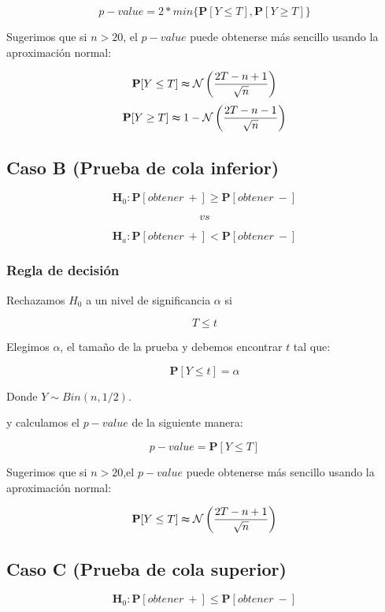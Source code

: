 \documentclass[
  a4paper,
  oneside,
  openany]{book}
\begin{document}
\[p-value=2*min\{\mathbf{P}[Y\leq T],\mathbf{P}[Y\geq T]\}\]

Sugerimos que si \(n > 20\), el \(p-value\) puede obtenerse más sencillo usando la aproximación normal:

\[\mathbf{P}[Y\leq T] \thickapprox  \mathcal{N}\left(\frac{2T-n+1}{\sqrt{n}}\right)\]
\[\mathbf{P}[Y\geq T] \thickapprox 1- \mathcal{N} \left(\frac{2T-n-1}{\sqrt{n}}\right)\]

\hypertarget{caso-b-prueba-de-cola-inferior-2}{%
\subsection*{Caso B (Prueba de cola inferior)}\label{caso-b-prueba-de-cola-inferior-2}}


\[\textbf{H}_0: \mathbf{P}[obtener\ +] \geq \mathbf{P}[obtener\ -]\]

\[vs\]

\[\textbf{H}_a: \mathbf{P}[obtener\ +] < \mathbf{P}[obtener\ -]\]

\hypertarget{regla-de-decisiuxf3n-7}{%
\subsubsection*{Regla de decisión}\label{regla-de-decisiuxf3n-7}}


Rechazamos \(H_0\) a un nivel de significancia \(\alpha\) si

\[T \leq t\]

Elegimos \(\alpha\), el tamaño de la prueba y debemos encontrar \(t\) tal que:

\[\mathbf{P}[Y \leq t]=\alpha\]

Donde \(Y \sim Bin (n,1/2)\).

y calculamos el \(p-value\) de la siguiente manera:

\[p-value=\mathbf{P}[Y\leq T]\]

Sugerimos que si \(n > 20\),el \(p-value\) puede obtenerse más sencillo usando la aproximación normal:

\[\mathbf{P}[Y\leq T] \thickapprox  \mathcal{N} \left(\frac{2T-n+1}{\sqrt{n}}\right)\]

\hypertarget{caso-c-prueba-de-cola-superior-1}{%
\subsection*{Caso C (Prueba de cola superior)}\label{caso-c-prueba-de-cola-superior-1}}


\[\textbf{H}_0: \mathbf{P}[obtener\ +] \leq \mathbf{P}[obtener\ -]\]
\end{document}
